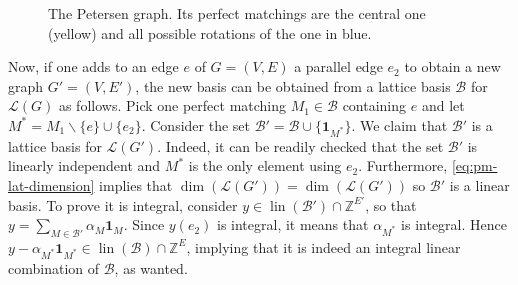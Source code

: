 \documentclass[11pt]{article}
\DeclareMathOperator{\lin}{lin}
\newcommand{\1}{\mathbf{1}}
\newcommand{\0}{\mathbf{0}}
\newcommand{\zB}{\mathcal B}
\newcommand{\zL}{\mathcal L}
\newcommand{\Z}{\mathbb{Z}}
\newcommand{\R}{\mathbb{R}}
\newcounter{claim-nb}[theorem]
\newcounter{claim-nbs}[section]
\begin{document}
\begin{figure}[!ht]\label{pic:petersen}
\centering
{}
\caption{The Petersen graph. Its perfect matchings are the central one (yellow) and all possible rotations of the one in blue.}
\end{figure}

Now, if one adds to an edge $e$ of $G=(V,E)$ a parallel edge $e_2$ to obtain a new graph $G'=(V,E')$, the new basis can be obtained from a lattice basis $\zB$ for $\zL(G)$ as follows.
Pick one perfect matching $M_1 \in \zB$ containing $e$ and let $M^*=M_1\backslash\{e\}\cup \{e_2\}$. Consider the set $\zB'=\zB\cup \{\mathbf{1}_{M^*}\}$. We claim that $\zB'$ is a lattice basis for $\zL(G')$. 
Indeed, it can be readily checked that the set $\zB'$ is linearly independent and $M^*$ is the only element using $e_2$. Furthermore, \eqref{eq:pm-lat-dimension} implies that $\dim(\zL(G'))=\dim (\zL(G'))$ so $\zB'$ is a linear basis. To prove it is integral, consider $y \in \lin(\zB')\cap \Z^{E'}$, so that $y = \sum_{M\in \zB'} \alpha_M \mathbf{1}_M$. Since $y(e_2)$ is integral, it means that $\alpha_{M^*}$ is integral. Hence $y-\alpha_{M^*}\mathbf{1}_{M^*} \in \lin (\zB) \cap \Z^{E}$, implying that it is indeed an integral linear combination of $\zB$, as wanted.
\end{document}
